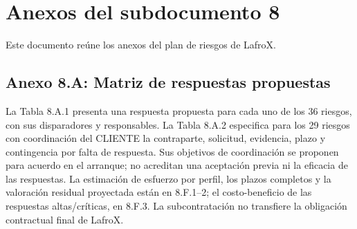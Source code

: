 \documentclass[carta,firma,sinnotas]{lafrox}
\begin{document}
\portadalafrox
\preliminareslafrox
\setcounter{chapter}{7}

\chapter{Anexos del subdocumento 8}

Este documento reúne los anexos del plan de riesgos de LafroX.

\section{Anexo 8.A: Matriz de respuestas propuestas}

La Tabla 8.A.1 presenta una respuesta propuesta para cada uno de los 36 riesgos, con sus disparadores y responsables. La Tabla 8.A.2 especifica para los 29 riesgos con coordinación del CLIENTE la contraparte, solicitud, evidencia, plazo y contingencia por falta de respuesta. Sus objetivos de coordinación se proponen para acuerdo en el arranque; no acreditan una aceptación previa ni la eficacia de las respuestas. La estimación de esfuerzo por perfil, los plazos completos y la valoración residual proyectada están en 8.F.1--2; el costo-beneficio de las respuestas altas/críticas, en 8.F.3. La subcontratación no transfiere la obligación contractual final de LafroX.
\end{document}
